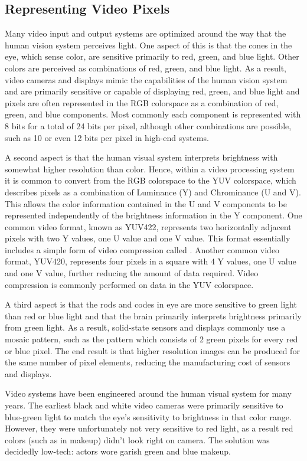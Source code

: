 \subsection{Representing Video Pixels}
Many video input and output systems are optimized around the way that the human vision system perceives light.  One aspect of this is that the cones in the eye, which sense color, are sensitive primarily to red, green, and blue light.  Other colors are perceived as combinations of red, green, and blue light. As a result, video cameras and displays mimic the capabilities of the human vision system and are primarily sensitive or capable of displaying red, green, and blue light and pixels are often represented in the RGB colorspace as a combination of red, green, and blue components.  Most commonly each component is represented with 8 bits for a total of 24 bits per pixel, although other combinations are possible, such as 10 or even 12 bits per pixel in high-end systems. 

A second aspect is that the human visual system interprets brightness with somewhat higher resolution than color. Hence, within a video processing system it is common to convert from the RGB colorspace to the YUV colorspace, which describes pixels as a combination of Luminance (Y) and Chrominance (U and V).  This allows the color information contained in the U and V components to be represented independently of the brightness information in the Y component. One common video format, known as YUV422, represents two horizontally adjacent pixels with two Y values, one U value and one V value.  This format essentially includes a simple form of video compression called .  Another common video format, YUV420, represents four pixels in a square with 4 Y values, one U value and one V value, further reducing the amount of data required.  Video compression is commonly performed on data in the YUV colorspace.

A third aspect is that the rods and codes in eye are more sensitive to green light than red or blue light and that the brain primarily interprets brightness primarily from green light. As a result, solid-state sensors and displays commonly use a mosaic pattern, such as the  pattern\cite{bayer76} which consists of 2 green pixels for every red or blue pixel.  The end result is that higher resolution images can be produced for the same number of pixel elements, reducing the manufacturing cost of sensors and displays.

\begin{aside}
Video systems have been engineered around the human visual system for many years.  The earliest black and white video cameras were primarily sensitive to blue-green light to match the eye's sensitivity to brightness in that color range.  However, they were unfortunately not very sensitive to red light, as a result red colors (such as in makeup) didn't look right on camera.  The solution was decidedly low-tech: actors wore garish green and blue makeup.
\end{aside}

